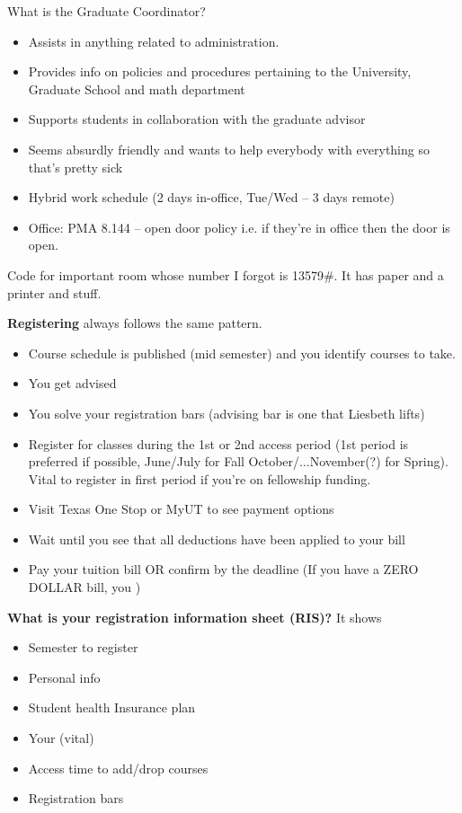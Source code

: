\bigskip

What is the Graduate Coordinator?
\begin{itemize}
	\item Assists in anything related to administration.
	\item Provides info on policies and procedures pertaining to the University, Graduate School and math department
	\item Supports students in collaboration with the graduate advisor
	\item Seems absurdly friendly and wants to help everybody with everything so that's pretty sick
	\item Hybrid work schedule (2 days in-office, Tue/Wed -- 3 days remote)
	\item Office: PMA 8.144 -- open door policy i.e. if they're in office then the door is open.
\end{itemize}

Code for important room whose number I forgot is 13579\#. It has paper and a printer and stuff.

\bigskip

\textbf{Registering} always follows the same pattern.
\begin{itemize}
	\item Course schedule is published (mid semester) and you identify courses to take.
	\item You get advised
	\item You solve your registration bars (advising bar is one that Liesbeth lifts)
	\item Register for classes during the 1st or 2nd access period (1st period is preferred if possible, June/July for Fall October/...November(?) for Spring). Vital to register in first period if you're on fellowship funding.
	\item Visit Texas One Stop or MyUT to see payment options
	\item Wait until you see that all deductions have been applied to your bill
\item Pay your tuition bill OR confirm by the deadline (If you have a ZERO DOLLAR bill, you ) 
\end{itemize}

\bigskip

\textbf{What is your registration information sheet (RIS)?} It shows
\begin{itemize}
	\item Semester to register
	\item Personal info
	\item Student health Insurance plan
	\item Your  (vital)
	\item Access time to add/drop courses
	\item Registration bars
\end{itemize}

